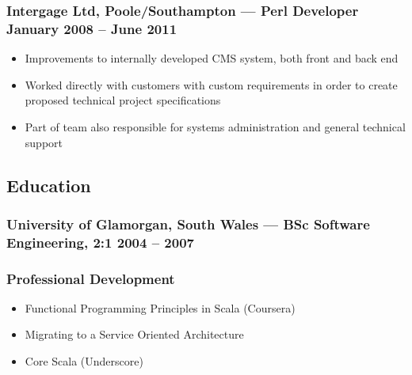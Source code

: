\documentclass[10pt, a4paper]{article}
\newcommand{\cvdate}[1]{{\small\mdseries\color{darkgray}#1}}
\providecommand{\tightlist}{%
  \setlength{\itemsep}{1pt}\setlength{\parskip}{0pt}}
\begin{document}
\subsubsection{\texorpdfstring{Intergage Ltd, Poole/Southampton --- Perl
Developer
\hfill \cvdate{January 2008 – June 2011}}{Intergage Ltd, Poole/Southampton --- Perl Developer }}\label{intergage-ltd-poolesouthampton-perl-developer}

\begin{itemize}
\tightlist
\item
  Improvements to internally developed CMS system, both front and back
  end
\item
  Worked directly with customers with custom requirements in order to
  create proposed technical project specifications
\item
  Part of team also responsible for systems administration and general
  technical support
\end{itemize}

\subsection{Education}\label{education}

\subsubsection{\texorpdfstring{University of Glamorgan, South Wales ---
BSc Software Engineering, 2:1
\hfill \cvdate{2004 – 2007}}{University of Glamorgan, South Wales --- BSc Software Engineering, 2:1 }}\label{university-of-glamorgan-south-wales-bsc-software-engineering-21}

\subsubsection{Professional Development}\label{professional-development}

\begin{itemize}
\tightlist
\item
  Functional Programming Principles in Scala (Coursera)
\item
  Migrating to a Service Oriented Architecture
\item
  Core Scala (Underscore)
\end{itemize}
\end{document}
